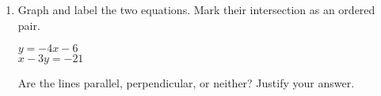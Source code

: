 \begin{enumerate}
\newpage
\item Graph and label the two equations. Mark their intersection as an ordered pair.
  \begin{multicols}{2}
    $y = -4x-6$ \\
    $x-3y = -21$
  \end{multicols}  \vspace{1cm}
  Are the lines parallel, perpendicular, or neither? Justify your answer.
  \vspace{1.5cm}
  \begin{center} %
  \end{center}


\end{enumerate}
